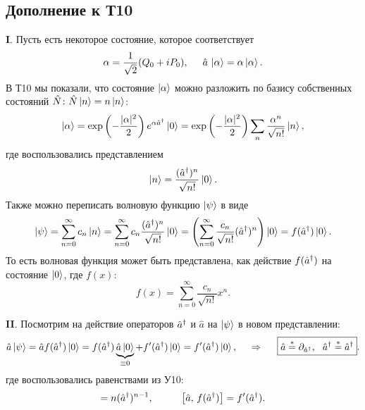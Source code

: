 
\subsection*{Дополнение к Т10}


\textbf{I}. 
Пусть есть некоторое состояние, которое соответствует 
\begin{equation*}
    \alpha = \frac{1}{\sqrt{2}} (Q_0 + i P_0),
    \hspace{5 mm} 
    \hat{a}\, \left| \alpha \right\rangle = \alpha \left| \alpha \right\rangle.
\end{equation*}
В Т10 мы показали, что состояние $\left| \alpha \right\rangle$ можно разложить по базису собственных состояний $\hat{N} \colon  \hat{N} \left| n \right\rangle = n \left| n \right\rangle$:
\begin{equation*}
    \left| \alpha \right\rangle = \exp\left(- \frac{|\alpha|^2}{2}\right) e^{\alpha \hat{a}^{\dag}} \left| 0 \right\rangle =
    \exp\left(- \frac{|\alpha|^2}{2}\right) \sum_n \frac{\alpha^n}{\sqrt{n!}} \left| n \right\rangle,
\end{equation*}
где воспользовались представлением
\begin{equation*}
    \left| n \right\rangle = \frac{(\hat{a}^{\dag})^n}{\sqrt{n!}} \left| 0 \right\rangle.
\end{equation*}
Также можно переписать волновую функцию $\left| \psi \right\rangle$ в виде
\begin{equation*}
    \left| \psi \right\rangle = \sum_{n=0}^{\infty} c_n  \left| n \right\rangle = \sum_{n=0}^{\infty} c_n \frac{(\hat{a}^{\dag})^n}{\sqrt{n!}} \left| 0 \right\rangle = \left(
        \sum_{n=0}^{\infty} \frac{c_n}{\sqrt{n!}} (\hat{a}^{\dag})^n
    \right) \left| 0 \right\rangle = f(\hat{a}^{\dag}) \left| 0 \right\rangle.
\end{equation*}
То есть волновая функция может быть представлена, как действие $f(\hat{a}^{\dag})$ на состояние $\left| 0 \right\rangle$, где $f(x)$:
\begin{equation*}
    f(x) = \sum_{n=0}^{\infty} \frac{c_n}{\sqrt{n!}} x^n.
\end{equation*}


\textbf{II}. Посмотрим на действие операторов $\hat{a}^{\dag}$ и $\hat{a}$ на $\left| \psi \right\rangle$ в новом представлении:
\begin{equation*}
    \hat{a} \ket{\psi} = \hat{a} f(\hat{a}\con) \ket{0} = f(\hat{a}\con) \underbrace{\hat{a} \ket{0}}_{\equiv 0} + f'(\hat{a}\con) \ket{0}= f'(\hat{a}\con) \ket{0},
    \hspace{0.5cm} \Rightarrow \hspace{0.5cm}
    \boxed{\hat{a} \overset{*}{=}  \partial_{\hat{a}\con}, \ \ \hat{a}\con \overset{*}{=}  \hat{a}\con}.
\end{equation*}
где воспользовались равенствами из У10:
\begin{equation*}
    [\hat{a},\, (\hat{a}\con)^n] = n (\hat{a}\con)^{n-1},
    \hspace{10 mm} 
    \left[\hat{a},\, f(\hat{a}\con)\right] = f'(\hat{a}\con).
\end{equation*}



